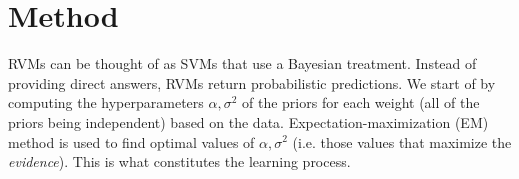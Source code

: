 \section{Method}
RVMs can be thought of as SVMs that use a Bayesian treatment. Instead of providing direct answers, RVMs return probabilistic predictions. We start of by computing the hyperparameters $\alpha,\sigma^2$ of the priors for each weight (all of the priors being independent) based on the data. Expectation-maximization (EM) method is used to  find optimal values of $\alpha,\sigma^2$ (i.e. those values that maximize the \textit{evidence}). This is what constitutes the learning process. %

